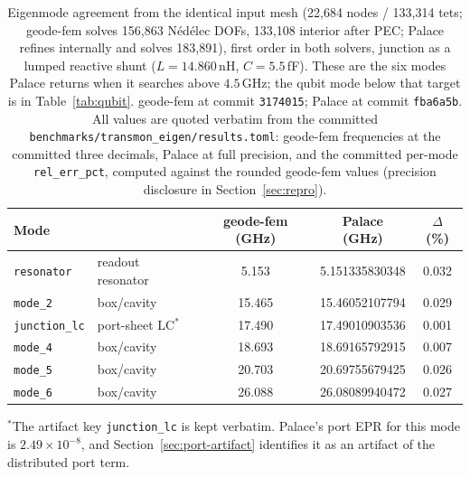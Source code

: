 \documentclass{anvil-paper}
\begin{document}
\begin{table}[t]
  \centering
  \caption{Eigenmode agreement from the identical input mesh (22{,}684
  nodes / 133{,}314 tets; geode-fem solves 156{,}863 N\'ed\'elec DOFs,
  133{,}108 interior after PEC; Palace refines internally and solves
  183{,}891), first order in both solvers, junction as a lumped reactive
  shunt ($L = 14.860$\,nH, $C = 5.5$\,fF). These are the six modes
  Palace returns when it searches above $4.5$\,GHz; the qubit mode below
  that target is in Table~\ref{tab:qubit}. geode-fem at commit
  \texttt{3174015}; Palace at commit \texttt{fba6a5b}. All values are
  quoted verbatim from the committed
  \texttt{benchmarks/transmon\_eigen/results.toml}: geode-fem frequencies
  at the committed three decimals, Palace at full precision, and the
  committed per-mode \texttt{rel\_err\_pct}, computed against the rounded
  geode-fem values (precision disclosure in Section~\ref{sec:repro}).}
  \label{tab:agreement}
  \small
  \begin{tabular}{@{}llccc@{}}
    \toprule
    Mode & & geode-fem (GHz) & Palace (GHz) & $\Delta$ (\%) \\
    \midrule
    \texttt{resonator} & readout resonator & 5.153 & 5.151335830348 & 0.032 \\
    \texttt{mode\_2} & box/cavity & 15.465 & 15.46052107794 & 0.029 \\
    \texttt{junction\_lc} & port-sheet LC$^{\ast}$ & 17.490 & 17.49010903536 & 0.001 \\
    \texttt{mode\_4} & box/cavity & 18.693 & 18.69165792915 & 0.007 \\
    \texttt{mode\_5} & box/cavity & 20.703 & 20.69755679425 & 0.026 \\
    \texttt{mode\_6} & box/cavity & 26.088 & 26.08089940472 & 0.027 \\
    \bottomrule
  \end{tabular}

  \smallskip
  {\footnotesize $^{\ast}$The artifact key \texttt{junction\_lc} is kept
  verbatim. Palace's port EPR for this mode is $2.49\times10^{-8}$, and
  Section~\ref{sec:port-artifact} identifies it as an artifact of the
  distributed port term.}
\end{table}
\end{document}
